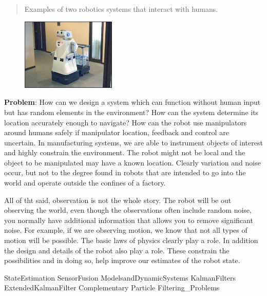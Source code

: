 \begin{quote}
Examples of two robotics systems that interact with humans.
\end{quote}

\begin{figure}
\centering
\includegraphics[width=0.4\textwidth,height=\textheight]{FilteringFigures/CartBot.png}
\caption{}
\end{figure}

\textbf{Problem}: How can we design a system which can function without
human input but has random elements in the environment? How can the
system determine its location accurately enough to navigate? How can the
robot use manipulators around humans safely if manipulator location,
feedback and control are uncertain. In manufacturing systems, we are
able to instrument objects of interest and highly constrain the
environment. The robot might not be local and the object to be
manipulated may have a known location. Clearly variation and noise
occur, but not to the degree found in robots that are intended to go
into the world and operate outside the confines of a factory.

All of tht said, observation is not the whole story. The robot will be
out observing the world, even though the observations often include
random noise, you normally have additional information that allows you
to remove significant noise. For example, if we are observing motion, we
know that not all types of motion will be possible. The basic laws of
physics clearly play a role. In addition the design and details of the
robot also play a role. These constrain the possibilities and in doing
so, help improve our estimates of the robot state.

StateEstimation SensorFusion ModelsandDynamicSystems KalmanFilters
ExtendedKalmanFilter Complementary Particle Filtering\_Problems
